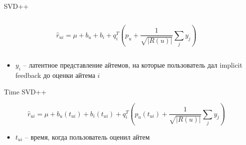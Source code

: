 \documentclass[11pt,aspectratio=169,handout]{beamer}
\begin{document}
\begin{frame}{SVD++}

\begin{columns}
\begin{column}{0.1\textwidth} 
\end{column}
\begin{column}{0.7\textwidth} 
\begin{tcolorbox}[colback=info!5,colframe=info!80,title=Модель]
\[
\hat r_{ui} = \mu + b_u + b_i + q_i^T \left( p_u + \frac{1}{\sqrt{|R(u)|}} \sum_j y_j \right)
\]
\end{tcolorbox}
\end{column}
\begin{column}{0.1\textwidth} 
\end{column}
\end{columns}

\vfill

\begin{itemize}
\item $y_i$ -- латентное представление айтемов, на которые пользователь дал implicit feedback до оценки айтема $i$
\end{itemize}

\end{frame}

\begin{frame}{Time SVD++}

\begin{tcolorbox}[colback=info!5,colframe=info!80,title=Модель]
\[
\hat r_{ui} = \mu + b_u(t_{ui}) + b_i(t_{ui}) + q_i^T \left( p_u(t_{ui}) + \frac{1}{\sqrt{|R(u)|}} \sum_j y_j \right)
\]
\end{tcolorbox}

\vfill

\begin{itemize}
\item $t_{ui}$ -- время, когда пользователь оценил айтем
\end{itemize}

\end{frame}
\end{document}
